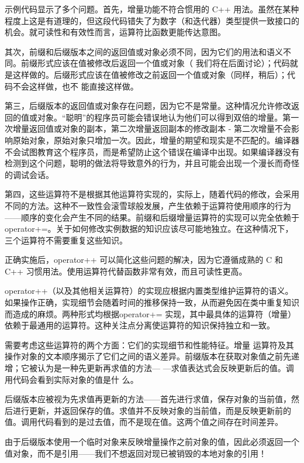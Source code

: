 
示例代码显示了多个问题。首先，增量功能不符合惯用的 C++ 用法。虽然在某种程度上这是有道理的，但这段代码错失了为数字（和迭代器）类型提供一致接口的机会。就可读性和有效性而言，运算符比函数更能传达意图。

其次，前缀和后缀版本之间的返回值或对象必须不同，因为它们的用法和语义不同。前缀形式应该在值被修改后返回一个值或对象（ 我们将在后面讨论）；代码就是这样做的。后缀形式应该在值被修改之前返回一个值或对象（同样，稍后）；代码不会这样做，也不 能直接这样做。

第三，后缀版本的返回值或对象存在问题，因为它不是常量。这种情况允许修改返回的值或对象。“聪明”的程序员可能会错误地认为他们可以得到双倍的增量。第一次增量返回值或对象的副本，第二次增量返回副本的修改副本 - 第二次增量不会影响原始对象，原始对象只增加一次。因此，增量的期望和现实是不匹配的。编译器 不会试图教育这个程序员，而是希望防止这个错误在编译中出现。如果编译器没有检测到这个问题，聪明的做法将导致意外的行为，并且可能会出现一个漫长而奇怪的调试会话。

第四，这些运算符不是根据其他运算符实现的，实际上，随着代码的修改，会采用不同的方法。这种不一致性会滚雪球般发展，产生依赖于运算符使用顺序的行为——顺序的变化会产生不同的结果。前缀和后缀增量运算符的实现可以完全依赖于 operator+=。关于如何修改实例数据的知识应该尽可能地独立。在这种情况下，三个运算符不需要重复这些知识。


正确实施后，operator++ 可以简化这些问题的解决，因为它遵循成熟的 C 和 C++ 习惯用法。使用运算符代替函数非常有效，而且可读性更高。

operator++（以及其他相关运算符）的实现应根据内置类型维护运算符的语义。如果操作正确，实现细节会随着时间的推移保持一致，从而避免因在类中重复知识而造成的麻烦。两种形式均根据operator+= 实现，其中最具体的运算符（增量）依赖于最通用的运算符。这种关注点分离使运算符的知识保持独立和一致。

需要考虑这些运算符的两个方面：它们的实现细节和性能特征。增量 运算符及其操作对象的文本顺序揭示了它们之间的语义差异。前缀版本在获取对象值之前先递增；它被认为是一种先更新再求值的方法— —求值表达式会反映更新后的值。调用代码会看到实际对象的值是什 么。

后缀版本应被视为先求值再更新的方法——首先进行求值，保存对象的当前值，然后进行更新，并返回保存的值。求值并不反映对象的当前值，而是反映更新前的值。调用代码看到的是过去值，而不是现在值。这两个值之间存在时间差异。

由于后缀版本使用一个临时对象来反映增量操作之前对象的值，因此必须返回一个值对象，而不是引用——我们不想返回对现已被销毁的本地对象的引用！

